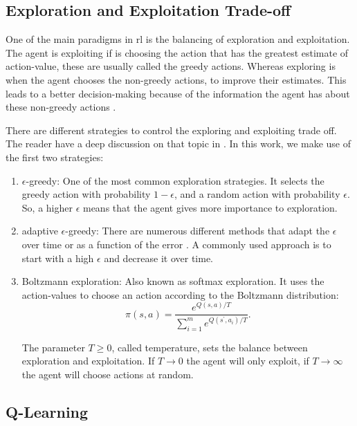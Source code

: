 \subsection{Exploration and Exploitation Trade-off}

One of the main paradigms in \gls{rl} is the balancing of exploration and exploitation.
%
The agent is exploiting if is choosing the action that has the greatest estimate of action-value, these are usually called the greedy actions.
%
Whereas exploring is when the agent chooses the non-greedy actions, to improve their estimates.
%
This leads to a better decision-making because of the information the agent has about these non-greedy actions \cite{sutton2018rl}.
%


There are different strategies to control the exploring and exploiting trade off. The reader have a deep discussion on that topic in \cite{exploration2016}.
%
In this work, we make use of the first two strategies:
\begin{enumerate}
  \item $\epsilon$-greedy: One of the most common exploration strategies. It selects the greedy action with probability $1-\epsilon$, and a random action with probability $\epsilon$. So, a higher $\epsilon$ means that the agent gives more importance to exploration.
  \item adaptive $\epsilon$-greedy: There are numerous different methods that adapt the $\epsilon$ over time or as a function of the error \cite{improvingBandits}. A commonly used approach is to start with a high $\epsilon$ and decrease it over time.
  \item Boltzmann exploration: Also known as softmax exploration. It uses the action-values to choose an action according to the Boltzmann distribution:
  \begin{equation}
      \pi\left(s, a\right)=\frac{e^{Q\left(s, a\right) / T}}{\sum_{i=1}^{m} e^{Q\left(s^{\prime}, a_i\right) / T}} \text{.}
  \end{equation}

  The parameter $T \geq 0$, called temperature, sets the balance between exploration and exploitation. If $T \rightarrow 0$  the agent will only exploit, if $T \rightarrow \infty$ the agent will choose actions at random.
\end{enumerate}


\subsection{Q-Learning}


